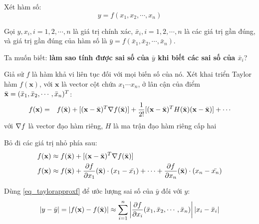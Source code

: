 \documentclass[12pt]{article}
\begin{document}
\newpage{}

Xét hàm số:
\begin{equation}
 y = f(x_1, x_2, \cdots, x_n)
\end{equation}

Gọi $y, x_i, i = 1, 2, \cdots, n$ là giá trị chính xác, $\bar{x}_i, i = 1, 2, \cdots, n$ là các giá trị gần đúng, và giá trị gần đúng của hàm số là $\bar{y} = f(\bar{x}_1, \bar{x}_2, \cdots, \bar{x}_n)$.

Ta muốn biết: \textbf{làm sao tính được sai số của $\bar{y}$ khi biết các sai số của $\bar{x}_i$}?
 
Giả sử $f$ là hàm khả vi liên tục đối với mọi biến số của nó. Xét khai triển Taylor hàm $f(\mathbf{x})$, với $\mathbf{x}$ là vector cột chứa $x_1 \cdots x_n$, ở lân cận của điểm $\bar{\mathbf{x}}=(\bar{x}_1, \bar{x}_2, \cdots, \bar{x}_n)^T$: %
\begin{align*}
 f(\mathbf{x}) &=& f(\bar{\mathbf{x}}) + [(\mathbf{x} - \bar{\mathbf{x}})^T \nabla f(\bar{\mathbf{x}})] + \frac{1}{2!}[(\mathbf{x} - \bar{\mathbf{x}})^T H(\bar{\mathbf{x}}) (\mathbf{x} - \bar{\mathbf{x}})] + \cdots
\end{align*}
với $\nabla f$ là vector đạo hàm riêng, $H$ là ma trận đạo hàm riêng cấp hai

\newpage{}

Bỏ đi các giá trị nhỏ phía sau:
\begin{align}
f(\mathbf{x}) &\approx f(\bar{\mathbf{x}}) + [(\mathbf{x} - \bar{\mathbf{x}})^T \nabla f(\bar{\mathbf{x}})] \\
f(\mathbf{x}) &\approx f(\bar{\mathbf{x}}) + \frac{\partial f}{\partial x_1}(\bar{\mathbf{x}}) \cdot (x_1 - \bar{x_1}) + \cdots + \frac{\partial f}{\partial x_n}(\bar{\mathbf{x}}) \cdot (x_n - \bar{x_n}) \label{eq_taylorapproxf}
\end{align}

Dùng \eqref{eq_taylorapproxf} để ước lượng sai số của $\bar{y}$ đối với $y$:
\begin{equation}\label{eq_saisoy}
 |y - \bar{y}| = |f(\mathbf{x}) - f(\bar{\mathbf{x}})| \approx \sum_{i=1}^n \left| \frac{\partial f}{\partial x_i}(\bar{x}_1, \bar{x}_2, \cdots, \bar{x}_n) \right| |x_i - \bar{x}_i|
\end{equation}
\end{document}
